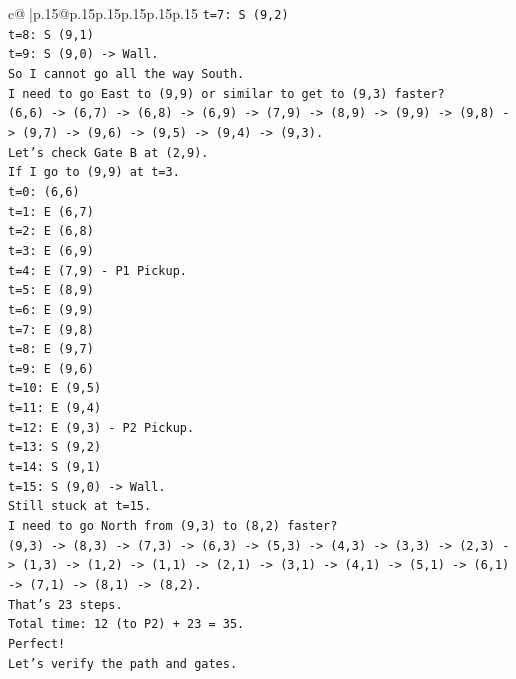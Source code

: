 \documentclass{article}
\begin{document}
{\begin{supertabular}{c@{$\;$}|p{.15\linewidth}@{}p{.15\linewidth}p{.15\linewidth}p{.15\linewidth}p{.15\linewidth}p{.15\linewidth}}
{{{\texttt{t=7: S (9,2)} \\
\texttt{t=8: S (9,1)} \\
\texttt{t=9: S (9,0) {-}> Wall.} \\
\texttt{So I cannot go all the way South.} \\
\texttt{I need to go East to (9,9) or similar to get to (9,3) faster?} \\
\texttt{(6,6) {-}> (6,7) {-}> (6,8) {-}> (6,9) {-}> (7,9) {-}> (8,9) {-}> (9,9) {-}> (9,8) {-}> (9,7) {-}> (9,6) {-}> (9,5) {-}> (9,4) {-}> (9,3).} \\
\texttt{Let's check Gate B at (2,9).} \\
\texttt{If I go to (9,9) at t=3.} \\
\texttt{t=0: (6,6)} \\
\texttt{t=1: E (6,7)} \\
\texttt{t=2: E (6,8)} \\
\texttt{t=3: E (6,9)} \\
\texttt{t=4: E (7,9) {-} P1 Pickup.} \\
\texttt{t=5: E (8,9)} \\
\texttt{t=6: E (9,9)} \\
\texttt{t=7: E (9,8)} \\
\texttt{t=8: E (9,7)} \\
\texttt{t=9: E (9,6)} \\
\texttt{t=10: E (9,5)} \\
\texttt{t=11: E (9,4)} \\
\texttt{t=12: E (9,3) {-} P2 Pickup.} \\
\texttt{t=13: S (9,2)} \\
\texttt{t=14: S (9,1)} \\
\texttt{t=15: S (9,0) {-}> Wall.} \\
\texttt{Still stuck at t=15.} \\
\texttt{I need to go North from (9,3) to (8,2) faster?} \\
\texttt{(9,3) {-}> (8,3) {-}> (7,3) {-}> (6,3) {-}> (5,3) {-}> (4,3) {-}> (3,3) {-}> (2,3) {-}> (1,3) {-}> (1,2) {-}> (1,1) {-}> (2,1) {-}> (3,1) {-}> (4,1) {-}> (5,1) {-}> (6,1) {-}> (7,1) {-}> (8,1) {-}> (8,2).} \\
\texttt{That's 23 steps.} \\
\texttt{Total time: 12 (to P2) + 23 = 35.} \\
\texttt{Perfect!} \\
\texttt{Let's verify the path and gates.} \\
}}}
\end{supertabular}}
\end{document}
